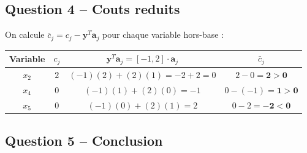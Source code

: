 \documentclass[12pt,a4paper]{article}
\begin{document}
\subsection{Question 4 -- Couts reduits}

\begin{correction}
On calcule $\bar{c}_j = c_j - \mathbf{y}^T \mathbf{a}_j$ pour chaque variable hors-base :

\begin{center}
\begin{tabular}{c|c|c|c}
\toprule
Variable & $c_j$ & $\mathbf{y}^T \mathbf{a}_j = [-1,2]\cdot\mathbf{a}_j$ & $\bar{c}_j$ \\
\midrule
$x_2$ & $2$ & $(-1)(2)+(2)(1) = -2+2 = 0$ & $2-0 = \mathbf{2 > 0}$ \\
$x_4$ & $0$ & $(-1)(1)+(2)(0) = -1$ & $0-(-1) = \mathbf{1 > 0}$ \\
$x_5$ & $0$ & $(-1)(0)+(2)(1) = 2$ & $0-2 = \mathbf{-2 < 0}$ \\
\bottomrule
\end{tabular}
\end{center}
\end{correction}

\subsection{Question 5 -- Conclusion}
\end{document}

